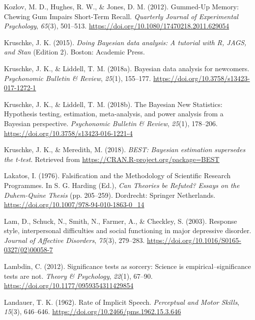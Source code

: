 \documentclass[a4paper,12pt,twoside,openright,oldfontcommands]{memoir}
\begin{document}
\leavevmode\hypertarget{ref-kozlov_gummed-up_2012}{}%
Kozlov, M. D., Hughes, R. W., \& Jones, D. M. (2012). Gummed-Up Memory: Chewing Gum Impairs Short-Term Recall. \emph{Quarterly Journal of Experimental Psychology}, \emph{65}(3), 501--513. \url{https://doi.org/10.1080/17470218.2011.629054}

\leavevmode\hypertarget{ref-kruschke_doing_2015}{}%
Kruschke, J. K. (2015). \emph{Doing Bayesian data analysis: A tutorial with R, JAGS, and Stan} (Edition 2). Boston: Academic Press.

\leavevmode\hypertarget{ref-kruschke_bayesian_2018}{}%
Kruschke, J. K., \& Liddell, T. M. (2018a). Bayesian data analysis for newcomers. \emph{Psychonomic Bulletin \& Review}, \emph{25}(1), 155--177. \url{https://doi.org/10.3758/s13423-017-1272-1}

\leavevmode\hypertarget{ref-kruschke_bayesian_2018-1}{}%
Kruschke, J. K., \& Liddell, T. M. (2018b). The Bayesian New Statistics: Hypothesis testing, estimation, meta-analysis, and power analysis from a Bayesian perspective. \emph{Psychonomic Bulletin \& Review}, \emph{25}(1), 178--206. \url{https://doi.org/10.3758/s13423-016-1221-4}

\leavevmode\hypertarget{ref-R-BEST}{}%
Kruschke, J. K., \& Meredith, M. (2018). \emph{BEST: Bayesian estimation supersedes the t-test}. Retrieved from \url{https://CRAN.R-project.org/package=BEST}

\leavevmode\hypertarget{ref-lakatos_falsification_1976}{}%
Lakatos, I. (1976). Falsification and the Methodology of Scientific Research Programmes. In S. G. Harding (Ed.), \emph{Can Theories be Refuted? Essays on the Duhem-Quine Thesis} (pp. 205--259). Dordrecht: Springer Netherlands. \url{https://doi.org/10.1007/978-94-010-1863-0_14}

\leavevmode\hypertarget{ref-lam_response_2003}{}%
Lam, D., Schuck, N., Smith, N., Farmer, A., \& Checkley, S. (2003). Response style, interpersonal difficulties and social functioning in major depressive disorder. \emph{Journal of Affective Disorders}, \emph{75}(3), 279--283. \url{https://doi.org/10.1016/S0165-0327(02)00058-7}

\leavevmode\hypertarget{ref-Lambdin2012}{}%
Lambdin, C. (2012). Significance tests as sorcery: Science is empirical--significance tests are not. \emph{Theory \& Psychology}, \emph{22}(1), 67--90. \url{https://doi.org/10.1177/0959354311429854}

\leavevmode\hypertarget{ref-landauer_rate_1962}{}%
Landauer, T. K. (1962). Rate of Implicit Speech. \emph{Perceptual and Motor Skills}, \emph{15}(3), 646--646. \url{https://doi.org/10.2466/pms.1962.15.3.646}
\end{document}
